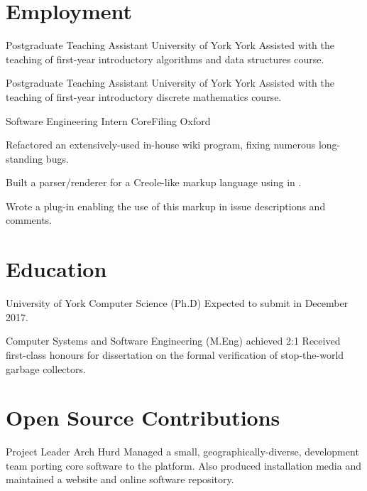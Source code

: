 \documentclass[a4paper]{cv}
\begin{document}
\section{Employment}

  {Postgraduate Teaching Assistant}
  {University of York}
  {York}
  {Assisted with the teaching of first-year introductory algorithms and
    data structures course.}

  {Postgraduate Teaching Assistant}
  {University of York}
  {York}
  {Assisted with the teaching of first-year introductory discrete mathematics course.}

  {Software Engineering Intern}
  {CoreFiling}
  {Oxford}
  {\begin{tightitemize}
    \item Refactored an extensively-used in-house wiki program, fixing
      numerous long-standing bugs.
    \item Built a parser/renderer for a Creole-like markup language
      using  in .
    \item Wrote a  plug-in enabling the use of this
      markup in issue descriptions and comments.
    \end{tightitemize}}

\section{Education}

\begin{educated}{University of York}
  {Computer Science (Ph.D)}
  {}
  {Expected to submit in December 2017.}

  {Computer Systems and Software Engineering (M.Eng)}
  {achieved 2:1}
  {Received first-class honours for dissertation on the formal
    verification of stop-the-world garbage collectors.}
\end{educated}

\section{Open Source Contributions}

  {Project Leader}
  {Arch Hurd}
  {}
  {Managed a small, geographically-diverse, development team porting
    core  software to the 
    platform. Also produced installation media and maintained a
    website and online software repository.}
\end{document}
